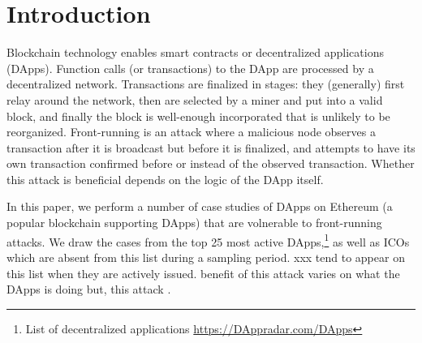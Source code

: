 \section{Introduction}

\label{sec:intro}


Blockchain technology enables smart contracts or decentralized applications (DApps). Function calls (or transactions) to the DApp are processed by a decentralized network. Transactions are finalized in stages: they (generally) first relay around the network, then are selected by a miner and put into a valid block, and finally the block is well-enough incorporated that is unlikely to be reorganized. Front-running is an attack where a malicious node observes a transaction after it is broadcast but before it is finalized, and attempts to have its own transaction confirmed before or instead of the observed transaction. Whether this attack is beneficial depends on the logic of the DApp itself.

In this paper, we perform a number of case studies of DApps on Ethereum (a popular blockchain supporting DApps) that are volnerable to front-running attacks. We draw the cases from the top 25 most active DApps,\footnote{List of decentralized applications \url{https://DAppradar.com/DApps}} as well as ICOs which are absent from this list during a sampling period. xxx tend to appear on this list when they are actively issued.      benefit of this attack varies on what the DApps is doing but, this attack . 

